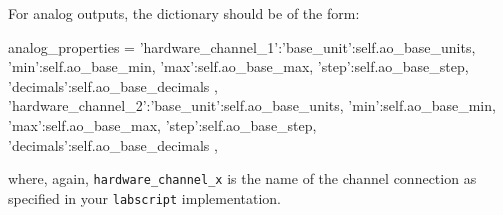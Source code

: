 \documentclass[12pt]{article}
\begin{document}
For analog outputs, the dictionary should be of the form:
\begin{python}
    analog_properties = {'hardware_channel_1':{'base_unit':self.ao_base_units,
                                               'min':self.ao_base_min,
                                               'max':self.ao_base_max,
                                               'step':self.ao_base_step,
                                               'decimals':self.ao_base_decimals
                                              },
                         'hardware_channel_2':{'base_unit':self.ao_base_units,
                                               'min':self.ao_base_min,
                                               'max':self.ao_base_max,
                                               'step':self.ao_base_step,
                                               'decimals':self.ao_base_decimals
                                              },
                        }
\end{python}
where, again, \texttt{hardware\_channel\_x} is the name of the channel connection as specified in your \texttt{labscript} implementation.
\end{document}
